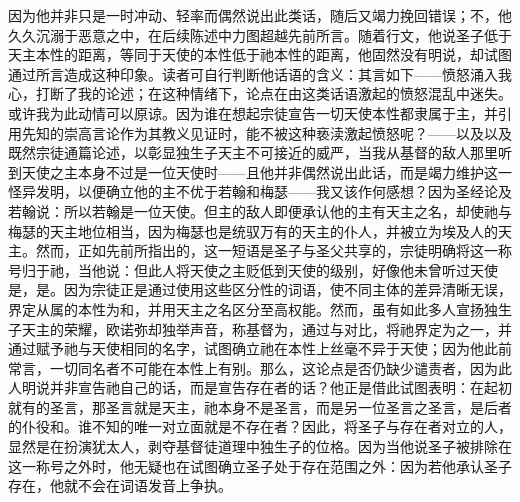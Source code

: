 因为他并非只是一时冲动、轻率而偶然说出此类话，随后又竭力挽回错误；不，他久久沉溺于恶意之中，在后续陈述中力图超越先前所言。随着行文，他说圣子低于天主本性的距离，等同于天使的本性低于祂本性的距离，他固然没有明说，却试图通过所言造成这种印象。读者可自行判断他话语的含义：其言如下——愤怒涌入我心，打断了我的论述；在这种情绪下，论点在由这类话语激起的愤怒混乱中迷失。或许我为此动情可以原谅。因为谁在想起宗徒宣告一切天使本性都隶属于主，并引用先知的崇高言论作为其教义见证时，能不被这种亵渎激起愤怒呢？——以及以及既然宗徒通篇论述，以彰显独生子天主不可接近的威严，当我从基督的敌人那里听到天使之主本身不过是一位天使时——且他并非偶然说出此话，而是竭力维护这一怪异发明，以便确立他的主不优于若翰和梅瑟——我又该作何感想？因为圣经论及若翰说：所以若翰是一位天使。但主的敌人即便承认他的主有天主之名，却使祂与梅瑟的天主地位相当，因为梅瑟也是统驭万有的天主的仆人，并被立为埃及人的天主。然而，正如先前所指出的，这一短语是圣子与圣父共享的，宗徒明确将这一称号归于祂，当他说：但此人将天使之主贬低到天使的级别，好像他未曾听过天使是，是。因为宗徒正是通过使用这些区分性的词语，使不同主体的差异清晰无误，界定从属的本性为和，并用天主之名区分至高权能。然而，虽有如此多人宣扬独生子天主的荣耀，欧诺弥却独举声音，称基督为，通过与对比，将祂界定为之一，并通过赋予祂与天使相同的名字，试图确立祂在本性上丝毫不异于天使；因为他此前常言，一切同名者不可能在本性上有别。那么，这论点是否仍缺少谴责者，因为此人明说并非宣告祂自己的话，而是宣告存在者的话？他正是借此试图表明：在起初就有的圣言，那圣言就是天主，祂本身不是圣言，而是另一位圣言之圣言，是后者的仆役和。谁不知的唯一对立面就是不存在者？因此，将圣子与存在者对立的人，显然是在扮演犹太人，剥夺基督徒道理中独生子的位格。因为当他说圣子被排除在这一称号之外时，他无疑也在试图确立圣子处于存在范围之外：因为若他承认圣子存在，他就不会在词语发音上争执。\par

